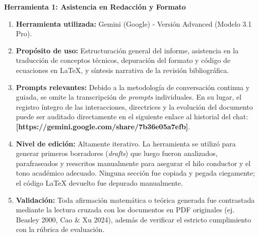 \documentclass[letter, 10pt]{article}
\begin{document}
\vspace{0.3cm}
\noindent \textbf{Herramienta 1: Asistencia en Redacci\'on y Formato}
\begin{enumerate}
    \item \textbf{Herramienta utilizada:} Gemini (Google) - Versi\'on Advanced (Modelo 3.1 Pro).
    \item \textbf{Prop\'osito de uso:} Estructuraci\'on general del informe, asistencia en la traducci\'on de conceptos t\'ecnicos, depuraci\'on del formato y c\'odigo de ecuaciones en \LaTeX{}, y s\'intesis narrativa de la revisi\'on bibliogr\'afica.
    \item \textbf{Prompts relevantes:} Debido a la metodolog\'ia de conversaci\'on continua y guiada, se omite la transcripci\'on de \textit{prompts} individuales. En su lugar, el registro \'integro de las interacciones, directrices y la evoluci\'on del documento puede ser auditado directamente en el siguiente enlace al historial del chat: \textbf{[https://gemini.google.com/share/7b36e05a7efb]}.
    \item \textbf{Nivel de edici\'on:} Altamente iterativo. La herramienta se utiliz\'o para generar primeros borradores (\textit{drafts}) que luego fueron analizados, parafraseados y reescritos manualmente para asegurar el hilo conductor y el tono acad\'emico adecuado. Ninguna secci\'on fue copiada y pegada ciegamente; el c\'odigo \LaTeX{} devuelto fue depurado manualmente.
    \item \textbf{Validaci\'on:} Toda afirmaci\'on matem\'atica o te\'orica generada fue contrastada mediante la lectura cruzada con los documentos en PDF originales (ej. Beasley 2000, Cao \& Xu 2024), adem\'as de verificar el estricto cumplimiento con la r\'ubrica de evaluaci\'on.
\end{enumerate}
\end{document}
